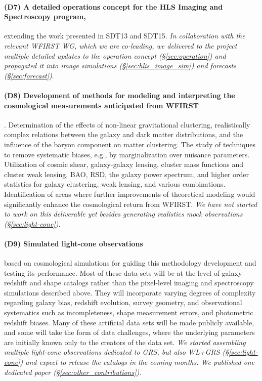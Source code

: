 \paragraph*{(D7) A detailed operations concept for the HLS Imaging and Spectroscopy
program,} extending the work presented in SDT13 and SDT15. \emph{In collaboration with the relevant WFIRST WG, which we are co-leading, we delivered to the project multiple detailed updates to the operation concept (\S \ref{sec:operation}) and propagated it into image simulations (\S \ref{sec:hlis_image_sim}) and forecasts (\S \ref{sec:forecast})}.

\paragraph*{(D8) Development of methods for modeling and interpreting the cosmological
measurements anticipated from WFIRST}. Determination of the effects of non-linear gravitational clustering, realistically complex relations between the
galaxy and dark matter distributions, and the influence of the baryon
component on matter clustering. The study of techniques to
remove systematic biases, e.g., by marginalization over nuisance
parameters. Utilization of cosmic shear, galaxy-galaxy lensing, cluster mass functions and cluster weak lensing, BAO, RSD, the galaxy
power spectrum, and higher order statistics for galaxy clustering, weak
lensing, and various combinations. Identification of areas where
further improvements of theoretical modeling would significantly
enhance the cosmological return from WFIRST. \emph{We have not started to work on this deliverable yet besides generating realistics mock observations (\S \ref{sec:light-cone})}.

\paragraph*{(D9) Simulated light-cone observations} based on cosmological simulations for guiding this methodology development and testing its performance.
Most of these data sets will be at the level of galaxy redshift and shape
catalogs rather than the pixel-level imaging and spectroscopy simulations
described above.  They will incorporate varying degrees of complexity
regarding galaxy bias, redshift evolution, survey geometry, and
observational systematics such as incompleteness, shape measurement errors,
and photometric redshift biases.  Many of these artificial data sets
will be made publicly available, and some will take the form of data
challenges, where the underlying parameters are initially known only
to the creators of the data set. \emph{We started assembling multiple light-cone observations dedicated to GRS, but also WL+GRS (\S \ref{sec:light-cone}) and expect to release the catalogs in the coming months. We published one dedicated paper (\S \ref{sec:other_contributions})}.

